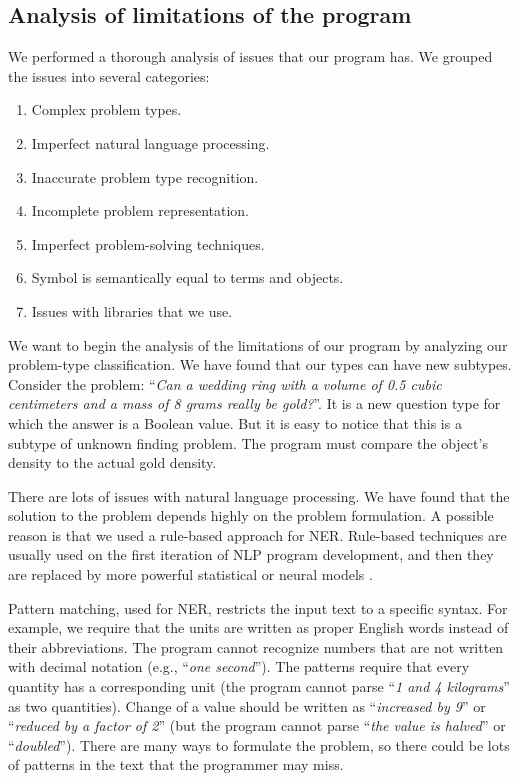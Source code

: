 \documentclass[a4paper, 12pt]{article}
\newcommand{\etext}[1]{\enquote{\textit{#1}}}
\begin{document}
	\subsection{Analysis of limitations of the program}
	
	We performed a thorough analysis of issues that our program has. We
	grouped the issues into several categories:
	
	\begin{enumerate}
	\item
	  Complex problem types.
	\item
	  Imperfect natural language processing.
	\item
	  Inaccurate problem type recognition.
	\item
	  Incomplete problem representation.
	\item
	  Imperfect problem-solving techniques.
	\item
	  Symbol is semantically equal to terms and objects.
	\item
	  Issues with libraries that we use.
	\end{enumerate}
	
	We want to begin the analysis of the limitations of our program by
	analyzing our problem-type classification. We have found that our types
	can have new subtypes. Consider the problem: \etext{Can a wedding ring
	with a volume of 0.5 cubic centimeters and a mass of 8 grams really be
	gold?}. It is a new question type for which the answer is a Boolean
	value. But it is easy to notice that this is a subtype of unknown
	finding problem. The program must compare the object's density to the
	actual gold density.
	
	There are lots of issues with natural language processing. We have found
	that the solution to the problem depends highly on the problem
	formulation. A possible reason is that we used a rule-based approach for
	NER. Rule-based techniques are usually used on the first iteration of
	NLP program development, and then they are replaced by more powerful
	statistical or neural models \cite{nlp}.
	
	Pattern matching, used for NER, restricts the input text to a specific
	syntax. For example, we require that the units are written as proper
	English words instead of their abbreviations. The program cannot
	recognize numbers that are not written with decimal notation (e.g.,
	\etext{one second}). The patterns require that every quantity has a
	corresponding unit (the program cannot parse \etext{1 and 4
	kilograms} as two quantities). Change of a value should be written as
	\etext{increased by 9} or \etext{reduced by a factor of 2} (but
	the program cannot parse \etext{the value is halved} or
	\etext{doubled}). There are many ways to formulate the problem, so
	there could be lots of patterns in the text that the programmer may
	miss.
	
\end{document}
